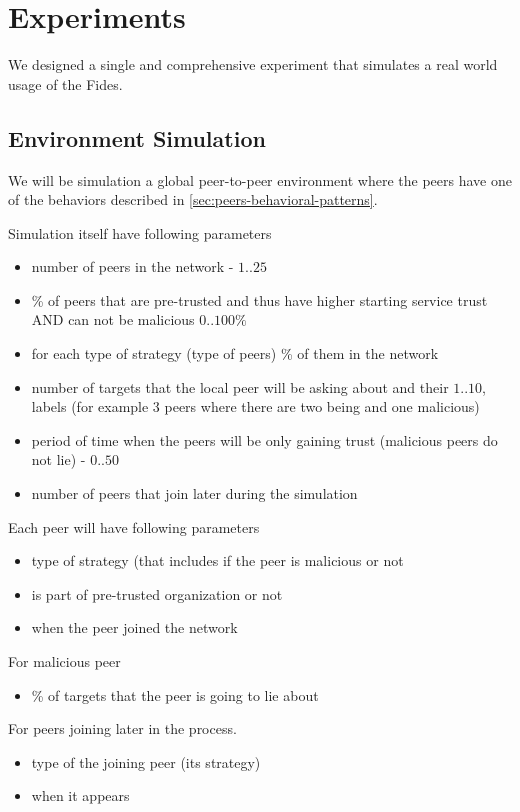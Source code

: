 \chapter{Experiments}
\label{chap:experiments}

We designed a single and comprehensive experiment that simulates a real world usage of the Fides. 





\section{Environment Simulation}
\label{sec:environment-simulation}
We will be simulation a global peer-to-peer environment where the peers have one of the behaviors described in \ref{sec:peers-behavioral-patterns}.

Simulation itself have following parameters
\begin{itemize}
    \item number of peers in the network - $1..25$
    \item \% of peers that are pre-trusted and thus have higher starting service trust AND can not be malicious $0..100\%$
    \item for each type of strategy (type of peers) \% of them in the network
    \item number of targets that the local peer will be asking about and their $1..10$, labels (for example 3 peers where there are two being and one malicious)
    \item period of time when the peers will be only gaining trust (malicious peers do not lie) - $0..50$
    \item number of peers that join later during the simulation
\end{itemize}

Each peer will have following parameters
\begin{itemize}
    \item type of strategy (that includes if the peer is malicious or not
    \item is part of pre-trusted organization or not
    \item when the peer joined the network
\end{itemize}

For malicious peer 
\begin{itemize}
    \item \% of targets that the peer is going to lie about
\end{itemize}

For peers joining later in the process.
\begin{itemize}
    \item type of the joining peer (its strategy)
    \item when it appears
\end{itemize}